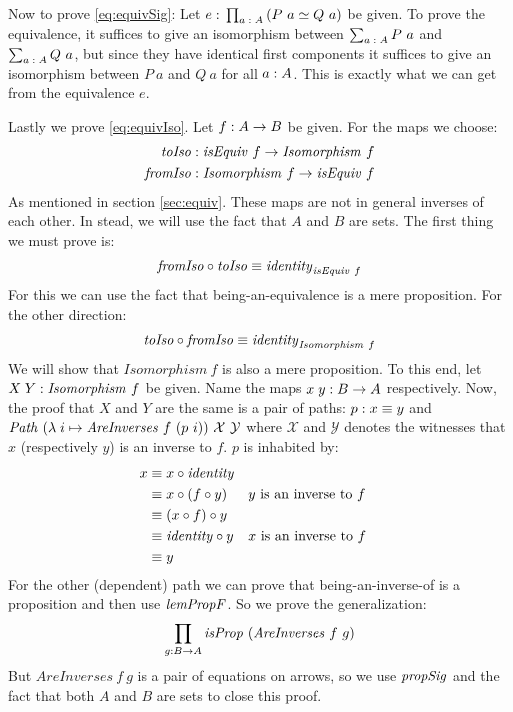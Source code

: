 Now to prove \ref{eq:equivSig}: Let $e \;\mathord{:}\; \prod_{a \;\mathord{:}\; A} \left( P\ a \simeq
Q\ a \right)$ be given. To prove the equivalence, it suffices to give an
isomorphism between $\sum_{a \tp A} P\ a$ and $\sum_{a \;\mathord{:}\; A} Q\ a$, but since
they have identical first components it suffices to give an isomorphism between
$P\ a$ and $Q\ a$ for all $a \;\mathord{:}\; A$. This is exactly what we can get from
the equivalence $e$.\QED

Lastly we prove \ref{eq:equivIso}. Let $f \;\mathord{:}\; A \to B$ be given. For the maps we
choose:
%
\begin{align*}
\mathit{toIso}
  & \;\mathord{:}\; \mathit{isEquiv}\ f             \to \mathit{Isomorphism}\ f \\
\mathit{fromIso}
  & \;\mathord{:}\; \mathit{Isomorphism}\ f \to \mathit{isEquiv}\ f
\end{align*}
%
As mentioned in section \ref{sec:equiv}. These maps are not in general inverses
of each other. In stead, we will use the fact that $A$ and $B$ are sets. The first thing we must prove is:
%
\begin{align*}
  \mathit{fromIso} \circ \mathit{toIso} \equiv \mathit{identity}_{\mathit{isEquiv}\ f}
\end{align*}
%
For this we can use the fact that being-an-equivalence is a mere proposition.
For the other direction:
%
\begin{align*}
  \mathit{toIso} \circ \mathit{fromIso} \equiv \mathit{identity}_{\mathit{Isomorphism}\ f}
\end{align*}
%
We will show that $\mathit{Isomorphism}\ f$ is also a mere proposition. To this
end, let $X\;Y \;\mathord{:}\; \mathit{Isomorphism}\ f$ be given. Name the maps $x\;y \;\mathord{:}\; B
\to A$ respectively. Now, the proof that $X$ and $Y$ are the same is a pair of
paths: $p \;\mathord{:}\; x \equiv y$ and $\mathit{Path}\ (\lambda\; i \mapsto
\mathit{AreInverses}\ f\ (p\ i))\ \mathcal{X}\ \mathcal{Y}$ where $\mathcal{X}$
and $\mathcal{Y}$ denotes the witnesses that $x$ (respectively $y$) is an
inverse to $f$. $p$ is inhabited by:
%
\begin{align*}
  x
  & \equiv x \circ \mathit{identity} \\
  & \equiv x \circ (f \circ y)
  && \text{$y$ is an inverse to $f$} \\
  & \equiv (x \circ f) \circ y \\
  & \equiv \mathit{identity} \circ y
  && \text{$x$ is an inverse to $f$} \\
  & \equiv y
\end{align*}
%
For the other (dependent) path we can prove that being-an-inverse-of is a
proposition and then use $\mathit{lemPropF}$. So we prove the generalization:
%
\begin{align}
\label{eq:propAreInversesGen}
\prod_{g : B \to A} \mathit{isProp}\ (\mathit{AreInverses}\ f\ g)
\end{align}
%
But $\mathit{AreInverses}\ f\ g$ is a pair of equations on arrows, so we use
$\mathit{propSig}$ and the fact that both $A$ and $B$ are sets to close this proof.

